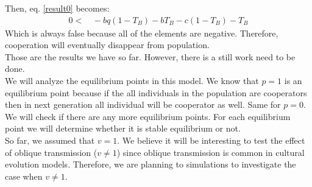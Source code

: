 \documentclass{article}
\begin{document}
Then, eq. \eqref{result0} becomes:
\begin{equation} 
\begin{split} \label{result4}
0 < & \,  - bq(1-T_B)- bT_B-c(1-T_B)-T_B
\end {split}
\end{equation}
Which is always false because all of the elements are negative. Therefore, cooperation will eventually disappear from population.
\\Those are the results we have so far. However, there is a still work need to be done. \\
We will analyze the equilibrium points in this model. We know that $p=1$ is an equilibrium point because if the all individuals in the population are cooperators then in next generation all individual will be cooperator as well. Same for $p=0$. We will check if there are any more equilibrium points. For each equilibrium point we will determine whether it is stable equilibrium or not. 
\\So far, we assumed that $v=1$. We believe it will be interesting to test the effect of oblique transmission ($v\neq 1$) since oblique transmission is common in cultural evolution models. Therefore, we are planning to simulations to investigate the case when $v\neq 1$. 
\end{document}
